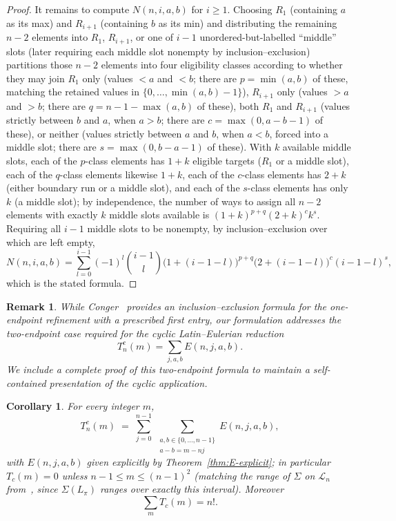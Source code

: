 \documentclass[11pt,a4paper]{amsart}
\newtheorem{corollary}[theorem]{Corollary}
\newtheorem{remark}[theorem]{Remark}
\newcommand{\1}{\mathbf{1}}
\begin{document}
\begin{proof}
It remains to compute $N(n,i,a,b)$ for $i\ge1$. Choosing $R_1$ (containing $a$ as its max) and $R_{i+1}$ (containing $b$ as its min) and distributing the remaining $n-2$ elements into $R_1$, $R_{i+1}$, or one of $i-1$ unordered-but-labelled ``middle'' slots (later requiring each middle slot nonempty by inclusion--exclusion) partitions those $n-2$ elements into four eligibility classes according to whether they may join $R_1$ only (values $<a$ and $<b$; there are $p=\min(a,b)$ of these, matching the retained values in $\{0,\dots,\min(a,b)-1\}$), $R_{i+1}$ only (values $>a$ and $>b$; there are $q=n-1-\max(a,b)$ of these), both $R_1$ and $R_{i+1}$ (values strictly between $b$ and $a$, when $a>b$; there are $c=\max(0,a-b-1)$ of these), or neither (values strictly between $a$ and $b$, when $a<b$, forced into a middle slot; there are $s=\max(0,b-a-1)$ of these). With $k$ available middle slots, each of the $p$-class elements has $1+k$ eligible targets ($R_1$ or a middle slot), each of the $q$-class elements likewise $1+k$, each of the $c$-class elements has $2+k$ (either boundary run or a middle slot), and each of the $s$-class elements has only $k$ (a middle slot); by independence, the number of ways to assign all $n-2$ elements with exactly $k$ middle slots available is $(1+k)^{p+q}(2+k)^ck^s$. Requiring all $i-1$ middle slots to be nonempty, by inclusion--exclusion over which are left empty,
\[
N(n,i,a,b) = \sum_{l=0}^{i-1}(-1)^l\binom{i-1}{l}\bigl(1+(i-1-l)\bigr)^{p+q}\bigl(2+(i-1-l)\bigr)^c(i-1-l)^s,
\]
which is the stated formula.
\end{proof}
\begin{remark}\label{rem:conger-explicit}
While Conger~\cite[Thm.~1, Eq.~(16)]{Conger2010} provides an inclusion--exclusion formula for the one-endpoint refinement with a prescribed first entry, our formulation addresses the two-endpoint case required for the cyclic Latin--Eulerian reduction
\[
T_n^c(m) = \sum_{j,a,b} E(n,j,a,b).
\]
We include a complete proof of this two-endpoint formula to maintain a self-contained presentation of the cyclic application.
\end{remark}
\begin{corollary}\label{cor:Tc-explicit}
For every integer $m$,
\[
T_n^c(m) \;=\; \sum_{j=0}^{n-1}\ \sum_{\substack{a,b\in\{0,\dots,n-1\}\\ a-b=m-nj}} E(n,j,a,b),
\]
with $E(n,j,a,b)$ given explicitly by Theorem~\ref{thm:E-explicit}; in particular $T_c(m)=0$ unless $n-1\le m\le(n-1)^2$ (matching the range of $\Sigma$ on $\mathcal L_n$ from~\cite{LEN}, since $\Sigma(L_\pi)$ ranges over exactly this interval). Moreover
\[
\sum_{m} T_c(m) = n!.
\]
\end{corollary}
\end{document}
